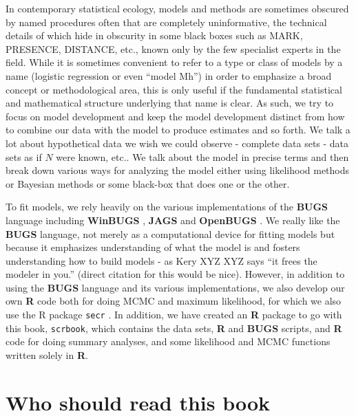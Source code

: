 In contemporary statistical ecology, models and methods are sometimes
obscured by named procedures often that are completely uninformative,
the technical details of which hide in obscurity in some black boxes
such as MARK, PRESENCE, DISTANCE, etc., known only by the few
specialist experts in the field. While it is sometimes convenient to
refer to a type or class of models by a name (logistic regression or
even ``model Mh'') in order to emphasize a broad concept or
methodological area, this is only useful if the fundamental
statistical and mathematical structure underlying that name is
clear. As such, we try to focus on model development and keep the
model development distinct from how to combine our data with the model
to produce estimates and so forth. We talk a lot about hypothetical
data we wish we could observe - complete data sets - data sets as if
$N$ were known, etc.. We talk about the model in precise terms and
then break down various ways for analyzing the model either using
likelihood methods or Bayesian methods or some black-box that does one
or the other.

To fit models, we rely heavily on the various implementations of the
{\bf BUGS} language including {\bf WinBUGS} \citep{lunn_etal:2000},
{\bf JAGS} \citep{plummer:2003}
 and {\bf OpenBUGS} \citep{thomas_etal:2006}. We really like
the {\bf BUGS} language, not merely  as a computational device for
fitting models but because it emphasizes
understanding of what the model is and fosters understanding how to
build models - as Kery XYZ XYZ says ``it frees the modeler in you.''  (direct
citation for this would be nice).  However, in addition to using the
{\bf BUGS} language and its various implementations, we also develop our own
{\bf R} code both for doing MCMC
and maximum likelihood, for which we also use the R
package \mbox{\tt secr} \citep{efford:2011}. In addition, we have
created an {\bf R} package to go with this book, \mbox{\tt scrbook},
which contains the data sets, {\bf R} and {\bf BUGS} scripts, and {\bf
  R} code for doing summary analyses, and some likelihood and MCMC
functions written solely in {\bf R}.


\section{Who should read this book}


